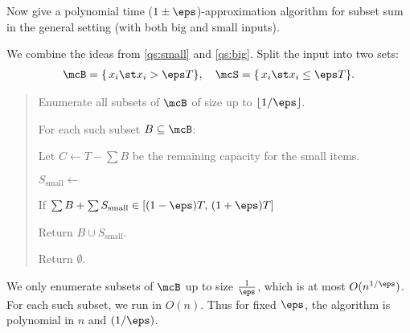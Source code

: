 \documentclass{article}
\begin{document}
\begin{subexercise}
  Now give a polynomial time ($ 1\pm \eps $)-approximation algorithm for subset sum in the general setting (with both big and small inputs).
\end{subexercise}

\begin{solution}
  We combine the ideas from \ref{qs:small} and \ref{qs:big}.
  Split the input into two sets:
  \begin{align*}
    \mcB = \{\,x_i \st x_i > \eps T\}, \quad \mcS = \{\,x_i \st x_i \le \eps T\}.
  \end{align*}

  \begin{quote}

  \begin{steps}
    \item Enumerate all subsets of $\mcB$ of size up to $\lfloor 1/\eps \rfloor$.
    \item For each such subset $B \subseteq \mcB$:
    \begin{steps}
      \item Let $C \leftarrow T - \sum B$ be the remaining capacity for the small items.
      \item $ S_{\text{small}} \leftarrow $ 
      \item If $\sum B + \sum S_{\text{small}} \in [(1-\eps)T,\,(1+\eps)T]$ \begin{steps}
        \item Return $B \cup S_{\text{small}}$.
      \end{steps}
    \end{steps}
    \item Return $\emptyset$.
  \end{steps}
  \end{quote}

  \begin{subproof}[Runtime]
  We only enumerate subsets of $\mcB$ up to size $\frac{1}{\eps}$, which is at most $O(n^{1/\eps})$.
  For each such subset, we run  in $O(n)$.
  Thus for fixed $\eps$, the algorithm is polynomial in $n$ and $(1/\eps)$.
  \end{subproof}


\end{solution}
\end{document}
